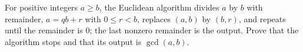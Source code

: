 For positive integers $a\ge b$, the Euclidean algorithm divides $a$ by $b$ with remainder, $a=qb+r$ with $0\le r<b$, replaces $(a,b)$ by $(b,r)$, and repeats until the remainder is $0$; the last nonzero remainder is the output. Prove that the algorithm stops and that its output is $\gcd(a,b)$.
